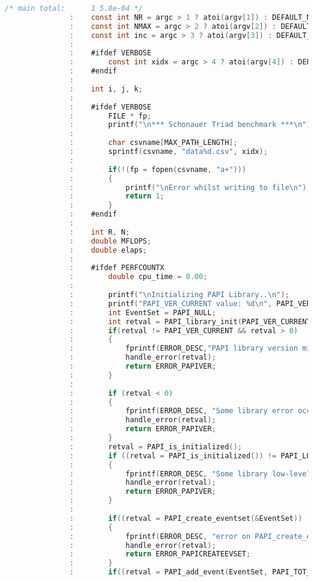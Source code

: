 \begin{lstlisting}[language=C,breaklines=true]
 /* main total:      1 5.8e-04 */
               :	const int NR = argc > 1 ? atoi(argv[1]) : DEFAULT_NR;
               :	const int NMAX = argc > 2 ? atoi(argv[2]) : DEFAULT_NMAX;
               :	const int inc = argc > 3 ? atoi(argv[3]) : DEFAULT_INC;
               :	
               :	#ifdef VERBOSE
               :		const int xidx = argc > 4 ? atoi(argv[4]) : DEFAULT_XIDX;
               :	#endif
               :	
               :	int i, j, k;
               :	
               :	#ifdef VERBOSE
               :		FILE * fp;
               :		printf("\n*** Schonauer Triad benchmark ***\n");
               :	
               :		char csvname[MAX_PATH_LENGTH];
               :	  	sprintf(csvname, "data%d.csv", xidx);
               :	
               :		if(!(fp = fopen(csvname, "a+")))
               :		{
               :			printf("\nError whilst writing to file\n");
               :			return 1;
               :		}
               :	#endif
               :	
               :	int R, N;
               :	double MFLOPS;
               :	double elaps;
               :	
               :	#ifdef PERFCOUNTX
               :		double cpu_time = 0.00;
               :
               :		printf("\nInitializing PAPI Library..\n");
               :		printf("PAPI_VER_CURRENT value: %d\n", PAPI_VER_CURRENT);
               :		int EventSet = PAPI_NULL;
               :		int retval = PAPI_library_init(PAPI_VER_CURRENT);
               :		if(retval != PAPI_VER_CURRENT && retval > 0)
               :		{
               :			fprintf(ERROR_DESC,"PAPI library version mismatch!\en");
               :			handle_error(retval);			
               :			return ERROR_PAPIVER;
               :		}
               :
               :		if (retval < 0)
               :		{
               :			fprintf(ERROR_DESC, "Some library error occurred: ");
               :			handle_error(retval);
               :			return ERROR_PAPIVER;
               :		}
               :		retval = PAPI_is_initialized();
               :		if ((retval = PAPI_is_initialized()) != PAPI_LOW_LEVEL_INITED)
               :		{
               :			fprintf(ERROR_DESC, "Some library low-level initialization error occurred: ");
               :			handle_error(retval);
               :			return ERROR_PAPIVER;
               :		}		
               :
               :		if((retval = PAPI_create_eventset(&EventSet)) != PAPI_OK)
               :		{
               :			fprintf(ERROR_DESC, "error on PAPI_create_eventset(): ");
               :			handle_error(retval);	
               :			return ERROR_PAPICREATEEVSET;
               :		}
               :		if((retval = PAPI_add_event(EventSet, PAPI_TOT_CYC)) != PAPI_OK)

\end{lstlisting}
